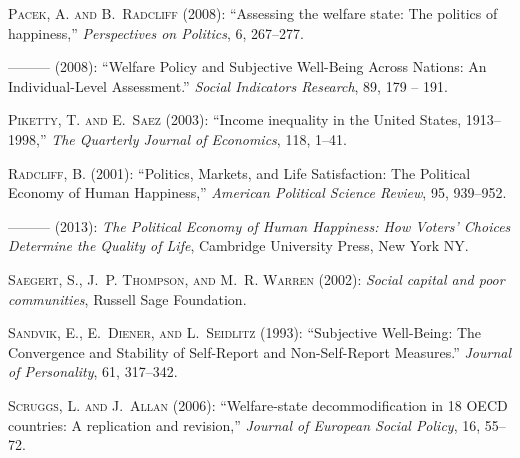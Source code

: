 \documentclass[10pt, letterpaper]{article}
\begin{document}
\begin{spacing}{1.4}
\begin{thebibliography}{71}
\textsc{Pacek, A. and B.~Radcliff} (2008{}): \enquote{Assessing the
  welfare state: The politics of happiness,} \emph{Perspectives on Politics},
  6, 267--277.

---\hspace{-.1pt}---\hspace{-.1pt}--- (2008{}): \enquote{Welfare
  Policy and Subjective Well-Being Across Nations: An Individual-Level
  Assessment.} \emph{Social Indicators Research}, 89, 179 -- 191.

\textsc{Piketty, T. and E.~Saez} (2003): \enquote{Income inequality in the
  United States, 1913--1998,} \emph{The Quarterly Journal of Economics}, 118,
  1--41.

\textsc{Radcliff, B.} (2001): \enquote{Politics, Markets, and Life
  Satisfaction: The Political Economy of Human Happiness,} \emph{American
  Political Science Review}, 95, 939--952.

---\hspace{-.1pt}---\hspace{-.1pt}--- (2013): \emph{The Political Economy of
  Human Happiness: How Voters' Choices Determine the Quality of Life},
  Cambridge University Press, New York NY.

\textsc{Saegert, S., J.~P. Thompson, and M.~R. Warren} (2002): \emph{Social
  capital and poor communities}, Russell Sage Foundation.

\textsc{Sandvik, E., E.~Diener, and L.~Seidlitz} (1993): \enquote{Subjective
  Well-Being: The Convergence and Stability of Self-Report and Non-Self-Report
  Measures.} \emph{Journal of Personality}, 61, 317--342.

\textsc{Scruggs, L. and J.~Allan} (2006): \enquote{Welfare-state
  decommodification in 18 OECD countries: A replication and revision,}
  \emph{Journal of European Social Policy}, 16, 55--72.


\end{thebibliography}
\end{spacing}
\end{document}
